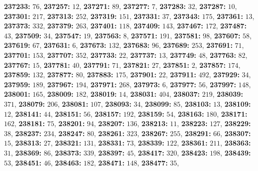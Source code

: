 \textsf{\bfseries 237233:} $76$, \textsf{\bfseries 237257:} $12$, \textsf{\bfseries 237271:} $89$, \textsf{\bfseries 237277:} $7$, \textsf{\bfseries 237283:} $32$, \textsf{\bfseries 237287:} $10$, \textsf{\bfseries 237301:} $217$, \textsf{\bfseries 237313:} $252$, \textsf{\bfseries 237319:} $151$, \textsf{\bfseries 237331:} $37$, \textsf{\bfseries 237343:} $175$, \textsf{\bfseries 237361:} $13$, \textsf{\bfseries 237373:} $332$, \textsf{\bfseries 237379:} $263$, \textsf{\bfseries 237401:} $118$, \textsf{\bfseries 237409:} $143$, \textsf{\bfseries 237467:} $172$, \textsf{\bfseries 237487:} $43$, \textsf{\bfseries 237509:} $34$, \textsf{\bfseries 237547:} $19$, \textsf{\bfseries 237563:} $8$, \textsf{\bfseries 237571:} $191$, \textsf{\bfseries 237581:} $98$, \textsf{\bfseries 237607:} $58$, \textsf{\bfseries 237619:} $67$, \textsf{\bfseries 237631:} $6$, \textsf{\bfseries 237673:} $132$, \textsf{\bfseries 237683:} $96$, \textsf{\bfseries 237689:} $253$, \textsf{\bfseries 237691:} $71$, \textsf{\bfseries 237701:} $153$, \textsf{\bfseries 237707:} $352$, \textsf{\bfseries 237733:} $22$, \textsf{\bfseries 237737:} $13$, \textsf{\bfseries 237749:} $48$, \textsf{\bfseries 237763:} $82$, \textsf{\bfseries 237767:} $15$, \textsf{\bfseries 237781:} $40$, \textsf{\bfseries 237791:} $71$, \textsf{\bfseries 237821:} $27$, \textsf{\bfseries 237851:} $2$, \textsf{\bfseries 237857:} $174$, \textsf{\bfseries 237859:} $132$, \textsf{\bfseries 237877:} $80$, \textsf{\bfseries 237883:} $175$, \textsf{\bfseries 237901:} $22$, \textsf{\bfseries 237911:} $492$, \textsf{\bfseries 237929:} $34$, \textsf{\bfseries 237959:} $189$, \textsf{\bfseries 237967:} $194$, \textsf{\bfseries 237971:} $268$, \textsf{\bfseries 237973:} $6$, \textsf{\bfseries 237977:} $56$, \textsf{\bfseries 237997:} $148$, \textsf{\bfseries 238001:} $165$, \textsf{\bfseries 238009:} $182$, \textsf{\bfseries 238019:} $14$, \textsf{\bfseries 238031:} $404$, \textsf{\bfseries 238037:} $219$, \textsf{\bfseries 238039:} $371$, \textsf{\bfseries 238079:} $206$, \textsf{\bfseries 238081:} $107$, \textsf{\bfseries 238093:} $34$, \textsf{\bfseries 238099:} $85$, \textsf{\bfseries 238103:} $13$, \textsf{\bfseries 238109:} $12$, \textsf{\bfseries 238141:} $44$, \textsf{\bfseries 238151:} $56$, \textsf{\bfseries 238157:} $192$, \textsf{\bfseries 238159:} $54$, \textsf{\bfseries 238163:} $180$, \textsf{\bfseries 238171:} $162$, \textsf{\bfseries 238181:} $75$, \textsf{\bfseries 238201:} $94$, \textsf{\bfseries 238207:} $136$, \textsf{\bfseries 238213:} $11$, \textsf{\bfseries 238223:} $127$, \textsf{\bfseries 238229:} $38$, \textsf{\bfseries 238237:} $234$, \textsf{\bfseries 238247:} $80$, \textsf{\bfseries 238261:} $323$, \textsf{\bfseries 238267:} $255$, \textsf{\bfseries 238291:} $66$, \textsf{\bfseries 238307:} $15$, \textsf{\bfseries 238313:} $27$, \textsf{\bfseries 238321:} $131$, \textsf{\bfseries 238331:} $73$, \textsf{\bfseries 238339:} $122$, \textsf{\bfseries 238361:} $211$, \textsf{\bfseries 238363:} $31$, \textsf{\bfseries 238369:} $86$, \textsf{\bfseries 238373:} $339$, \textsf{\bfseries 238397:} $45$, \textsf{\bfseries 238417:} $320$, \textsf{\bfseries 238423:} $198$, \textsf{\bfseries 238439:} $53$, \textsf{\bfseries 238451:} $46$, \textsf{\bfseries 238463:} $182$, \textsf{\bfseries 238471:} $148$, \textsf{\bfseries 238477:} $35$, 
